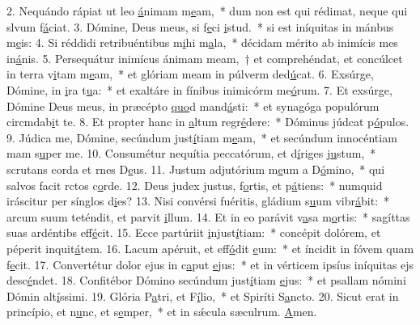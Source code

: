 2. Nequándo rápiat ut leo \uline{á}nimam m\uline{e}am,~* dum non est qui rédimat, neque qui slvum f\uline{á}ciat.
3. Dómine, Deus meus, si f\uline{e}ci \uline{i}stud.~* si est iníquitas in mánbus m\uline{e}is:
4. Si réddidi retribuéntibus m\uline{i}hi m\uline{a}la,~* décidam mérito ab inimícis mes in\uline{á}nis.
5. Persequátur inimícus ánimam meam,~† et comprehéndat, et concúlcet in terra v\uline{i}tam m\uline{e}am,~* et glóriam meam in púlverm ded\uline{ú}cat.
6. Exsúrge, Dómine, in \uline{i}ra t\uline{u}a:~* et exaltáre in fínibus inimicórm me\uline{ó}rum.
7. Et exsúrge, Dómine Deus meus, in præcépto \uline{quo}d mand\uline{á}sti:~* et synagóga populórum circmdab\uline{i}t te.
8. Et propter hanc in \uline{a}ltum regr\uline{é}dere:~* Dóminus júdcat p\uline{ó}pulos.
9. Júdica me, Dómine, secúndum just\uline{í}tiam m\uline{e}am,~* et secúndum innocéntiam mam s\uline{u}per me.
10. Consumétur nequítia peccatórum, et d\uline{í}riges j\uline{u}stum,~* scrutans corda et rnes D\uline{e}us.
11. Justum adjutórium m\uline{e}um a D\uline{ó}mino,~* qui salvos facit rctos c\uline{o}rde.
12. Deus judex justus, f\uline{o}rtis, et p\uline{á}tiens:~* numquid iráscitur per sínglos d\uline{i}es?
13. Nisi convérsi fuéritis, gládium s\uline{u}um vibr\uline{á}bit:~* arcum suum teténdit, et parvit \uline{i}llum.
14. Et in eo parávit v\uline{a}sa m\uline{o}rtis:~* sagíttas suas ardéntibs eff\uline{é}cit.
15. Ecce partúriit \uline{i}njust\uline{í}tiam:~* concépit dolórem, et péperit inquit\uline{á}tem.
16. Lacum apéruit, et eff\uline{ó}dit \uline{e}um:~* et íncidit in fóvem quam f\uline{e}cit.
17. Convertétur dolor ejus in c\uline{a}put \uline{e}jus:~* et in vérticem ipsíus iníquitas ejs desc\uline{é}ndet.
18. Confitébor Dómino secúndum just\uline{í}tiam \uline{e}jus:~* et psallam nómini Dómin alt\uline{í}ssimi.
19. Glória P\uline{a}tri, et F\uline{í}lio,~* et Spiríti S\uline{a}ncto.
20. Sicut erat in princípio, et n\uline{u}nc, et s\uline{e}mper,~* et in sǽcula sæculrum. \uline{A}men.
